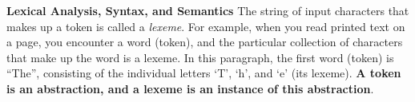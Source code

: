 \begin{minipage}[t]{\sw}
\slidenumber
\LARGE
{\bf Lexical Analysis, Syntax, and Semantics}\exx
The string of input characters that makes up a token
is called a {\em lexeme}.
For example, when you read printed text on a page,
you encounter a word (token),
and the particular collection of characters that make up the word
is a lexeme.
In this paragraph, the first word (token) is ``The'',
consisting of the individual letters `T', `h', and `e' (its lexeme).
{\bf A token is an abstraction, and a lexeme 
is an instance of this abstraction}.\exx
\end{minipage}
